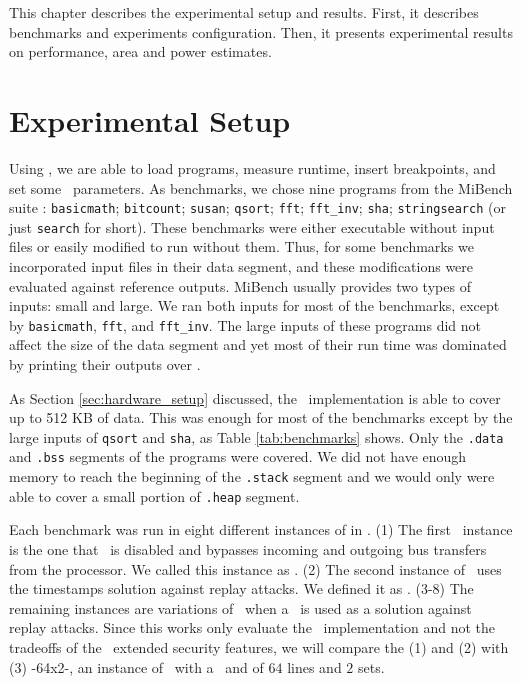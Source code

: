 

This chapter describes the experimental setup and results. First, it describes benchmarks and experiments configuration. Then, it presents experimental results on performance, area and power estimates.

\section{Experimental Setup}
\label{subsec:Experimental-Setup}

Using \grmon, we are able to load programs, measure runtime, insert breakpoints, and set some \leon~parameters. As benchmarks, we chose nine programs from the MiBench suite \cite{MiBench}: \texttt{basicmath}; \texttt{bitcount}; \texttt{susan}; \texttt{qsort}; \texttt{fft}; \texttt{fft\_inv}; \texttt{sha}; \texttt{stringsearch} (or just \texttt{search} for short). These benchmarks were either executable without input files or easily modified to run without them. Thus, for some benchmarks we incorporated input files in their data segment, and these modifications were evaluated against reference outputs. MiBench usually provides two types of inputs: small and large. We ran both inputs for most of the benchmarks, except by \texttt{basicmath}, \texttt{fft}, and \texttt{fft\_inv}. The large inputs of these programs did not affect the size of the data segment and yet most of their run time was dominated by printing their outputs over \grmon.

As Section \ref{sec:hardware_setup} discussed, the \cshia~implementation is able to cover up to 512 KB of data. This was enough for most of the benchmarks except by the large inputs of \texttt{qsort} and \texttt{sha}, as Table \ref{tab:benchmarks} shows. Only the \texttt{.data} and \texttt{.bss} segments of the programs were covered. We did not have enough memory to reach the beginning of the \texttt{.stack} segment and we would only were able to cover a small portion of \texttt{.heap} segment.

Each benchmark was run in eight different instances of \cshia in \cite{caio}. (1) The first \cshia~instance is the one that \handler~is disabled and bypasses incoming and outgoing bus transfers from the processor. We called this instance as \baseline. (2) The second instance of \cshia~uses the timestamps solution against replay attacks. We defined it as \timestamp. (3-8) The remaining instances are variations of \cshia~when a \mt~is used as a solution against replay attacks. Since this works only evaluate the \cshia~implementation and not the tradeoffs of the \cshia~extended security features, we will compare the (1) and (2) with (3) \cshiamt-64x2-\lru , an instance of \cshia~with a \mt~and \ptagcache of $64$ lines and $2$ sets.

